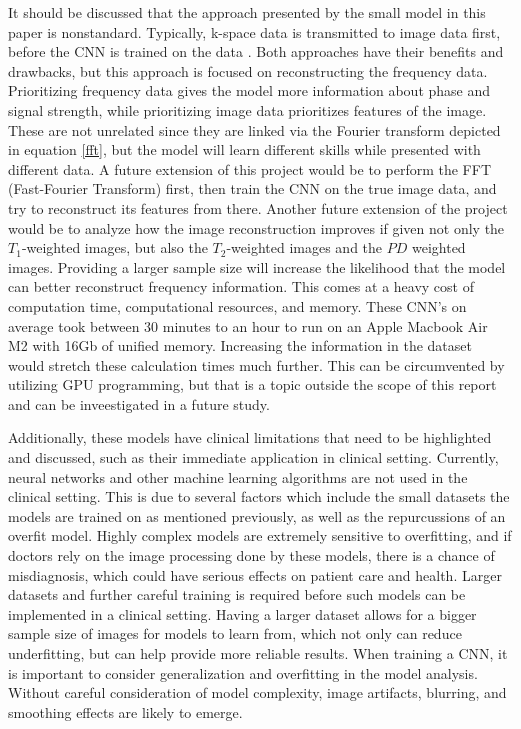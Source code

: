 \documentclass[14pt]{extreport}
\begin{document}
        It should be discussed that the approach presented by the small model in this paper is nonstandard. Typically, k-space data is transmitted to image data first, before the CNN is trained on the data \cite{Wang_Su_Ying_Peng_Zhu_Liang_Feng_Liang_2016}. Both approaches have their benefits and drawbacks, but this approach is focused on reconstructing the frequency data. Prioritizing frequency data gives the model more information about phase and signal strength, while prioritizing image data prioritizes features of the image. These are not unrelated since they are linked via the Fourier transform depicted in equation \eqref{fft}, but the model will learn different skills while presented with different data. A future extension of this project would be to perform the FFT (Fast-Fourier Transform) first, then train the CNN on the true image data, and try to reconstruct its features from there. Another future extension of the project would be to analyze how the image reconstruction improves if given not only the $T_1$-weighted images, but also the $T_2$-weighted images and the $PD$ weighted images. Providing a larger sample size will increase the likelihood that the model can better reconstruct frequency information. This comes at a heavy cost of computation time, computational resources, and memory. These CNN's on average took between 30 minutes to an hour to run on an Apple Macbook Air M2 with 16Gb of unified memory. Increasing the information in the dataset would stretch these calculation times much further. This can be circumvented by utilizing GPU programming, but that is a topic outside the scope of this report and can be inveestigated in a future study.

        Additionally, these models have clinical limitations that need to be highlighted and discussed, such as their immediate application in clinical setting. Currently, neural networks and other machine learning algorithms are not used in the clinical setting. This is due to several factors which include the small datasets the models are trained on as mentioned previously, as well as the repurcussions of an overfit model. Highly complex models are extremely sensitive to overfitting, and if doctors rely on the image processing done by these models, there is a chance of misdiagnosis, which could have serious effects on patient care and health. Larger datasets and further careful training is required before such models can be implemented in a clinical setting. Having a larger dataset allows for a bigger sample size of images for models to learn from, which not only can reduce underfitting, but can help provide more reliable results. When training a CNN, it is important to consider generalization and overfitting in the model analysis. Without careful consideration of model complexity, image artifacts, blurring, and smoothing effects are likely to emerge.
    
\end{document}
